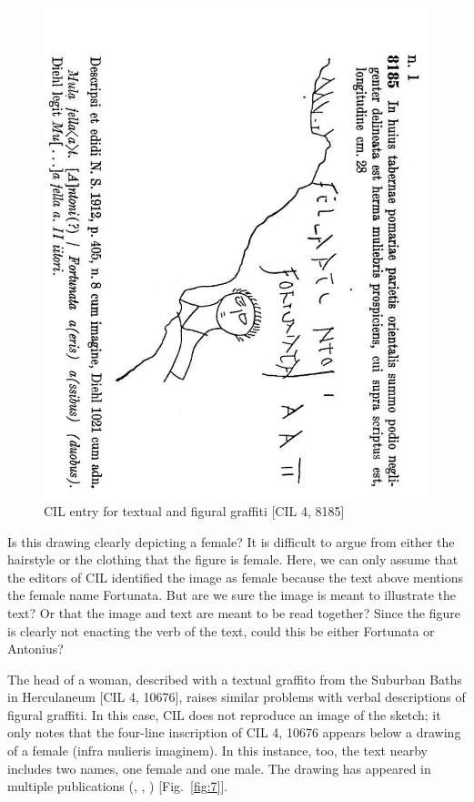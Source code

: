\documentclass[amsthm,ebook]{saparticle}
\begin{document}
\begin{figure}[!bp]
\centering
 \includegraphics[width=\columnwidth]{EAGLE2016BenefielSypniewski-img006.jpg}
\caption{CIL entry for textual and figural graffiti [CIL 4, 8185]}
\label{fig:6}
\end{figure}




Is this drawing clearly depicting a female? It is difficult to argue from either the hairstyle or the clothing that the
figure is female. Here, we can only assume that the editors of CIL identified the image as female because the text
above mentions the female name Fortunata. But are we sure the image is meant to illustrate the text? Or that the image
and text are meant to be read together? Since the figure is clearly not enacting the verb of the text, could this be
either Fortunata or Antonius?

The head of a woman, described with a textual graffito from the Suburban Baths in Herculaneum [CIL 4, 10676], raises
similar problems with verbal descriptions of figural graffiti. In this case, CIL does not reproduce an image of the
sketch; it only notes that the four-line inscription of CIL 4, 10676 appears below a drawing of a female (infra
mulieris imaginem). In this instance, too, the text nearby includes two names, one female and one male. The drawing has
appeared in multiple publications (\citet{della_corte_loves_1960}, \citet{deiss_herculaneum_1989}, \citet{vivolo_pompei:_1993}) [Fig.~\ref{fig:7}]. 
\end{document}
